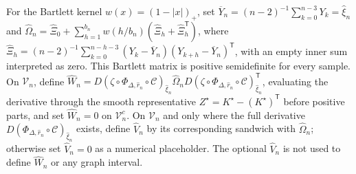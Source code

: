 For the Bartlett kernel \(w(x)=(1-|x|)_+\), set \(\overline Y_n=(n-2)^{-1}\sum_{k=0}^{n-3}Y_k=\widehat\xi_n\) and \(\widehat\Omega_n=\widehat\Xi_0+\sum_{h=1}^{b_n}w(h/b_n)(\widehat\Xi_h+\widehat\Xi_h^{\mathsf T})\), where \(\widehat\Xi_h=(n-2)^{-1}\sum_{k=0}^{n-h-3}(Y_k-\overline Y_n)(Y_{k+h}-\overline Y_n)^{\mathsf T}\), with an empty inner sum interpreted as zero. This Bartlett matrix is positive semidefinite for every sample. On \(\mathcal V_n\), define \(\widehat W_n=D(\zeta\circ\Phi_{\Delta,\widehat r_n}\circ\mathcal C)_{\widehat\xi_n}\widehat\Omega_nD(\zeta\circ\Phi_{\Delta,\widehat r_n}\circ\mathcal C)_{\widehat\xi_n}^{\mathsf T}\), evaluating the derivative through the smooth representative \(Z^\star=K^\star-(K^\star)^{\mathsf T}\) before positive parts, and set \(\widehat W_n=0\) on \(\mathcal V_n^c\). On \(\mathcal V_n\) and only where the full derivative \(D(\Phi_{\Delta,\widehat r_n}\circ\mathcal C)_{\widehat\xi_n}\) exists, define \(\widehat V_n\) by its corresponding sandwich with \(\widehat\Omega_n\); otherwise set \(\widehat V_n=0\) as a numerical placeholder. The optional \(\widehat V_n\) is not used to define \(\widehat W_n\) or any graph interval.